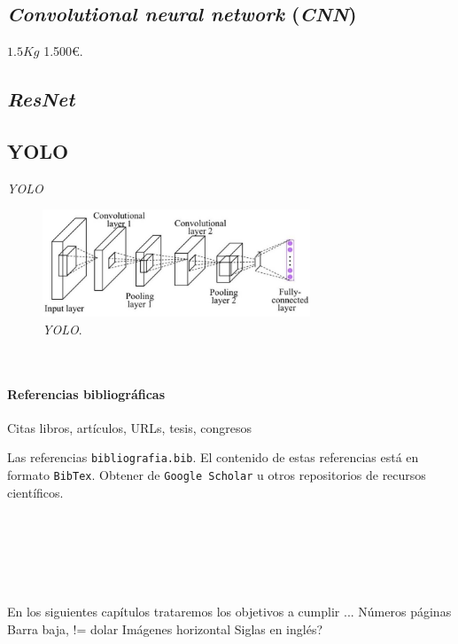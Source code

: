\subsection{\textit{Convolutional neural network} (\textit{CNN})}
\label{sec:cnn}

$1.5Kg$ 1.500\euro.

\subsection{\textit{ResNet}}
\label{sec:resnet}

\subsection{YOLO}
\label{sec:yolo}

\textit{YOLO}
\begin{figure} [h!]
	\begin{center}
		\includegraphics[width=8cm]{figs/yolo}
	\end{center}
	\caption{\textit{YOLO}.}
	\label{fig:yolo}
\end{figure}\

\paragraph{Referencias bibliográficas}
\label{sec:referencias}

Citas libros, artículos, URLs, tesis, congresos

Las referencias \texttt{bibliografia.bib}. El contenido de estas referencias está en formato \texttt{BibTex}. Obtener de \texttt{Google Scholar} u otros repositorios de recursos científicos.

\

\

\

En los siguientes capítulos trataremos los objetivos a cumplir ...
Números páginas
Barra baja, != dolar
Imágenes horizontal
Siglas en inglés?
